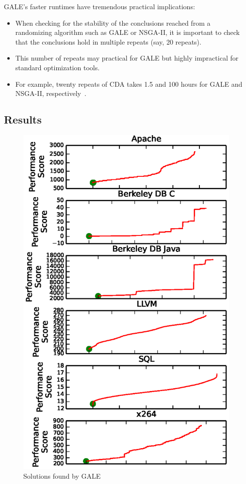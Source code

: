 \documentclass{sig-alternative}
\newcommand{\bi}{\begin{itemize}[leftmargin=0.4cm]}
\newcommand{\ei}{\end{itemize}}
\begin{document}
GALE's faster runtimes have  tremendous practical implications:
\bi
\item When checking for the stability of the conclusions reached from a randomizing
algorithm  such as GALE or NSGA-II, it is important to check that the conclusions hold in multiple repeats (say, 20 repeats). 
\item This number of repeats may practical for GALE but  highly impractical for standard optimization tools.
\item For example, twenty repeats of CDA takes 1.5 and 100 hours for GALE and NSGA-II, respectively~\cite{krallphd}.
\ei
\subsection{Results}

\begin{figure}[!t]
\includegraphics[width=0.9\linewidth]{Figures/optimizer_result.eps}
\caption{Solutions found by GALE}\label{fig:performance_graph}
\end{figure}
\end{document}
